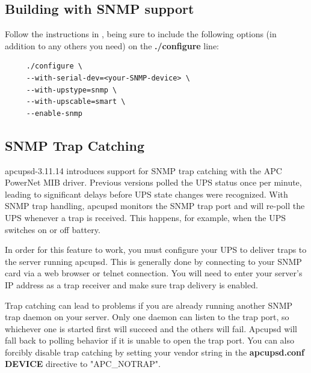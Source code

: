 {{{{{{{\subsection*{Building with SNMP support}

Follow the instructions in 
,
being sure to include the following options (in addition to any others you need) on the
{\bf ./configure} line: 

\footnotesize
\begin{verbatim}
     ./configure \
     --with-serial-dev=<your-SNMP-device> \
     --with-upstype=snmp \
     --with-upscable=smart \
     --enable-snmp
\end{verbatim}
\normalsize

\label{SNMP-Trap-Catching}
\subsection*{SNMP Trap Catching}

apcupsd-3.11.14 introduces support for SNMP trap catching with the APC
PowerNet MIB driver. Previous versions polled the UPS status once per minute, 
leading to significant delays before UPS state changes were recognized. With 
SNMP trap handling, apcupsd monitors the SNMP trap port and will re-poll the
UPS whenever a trap is received. This happens, for example, when the UPS 
switches on or off battery.

In order for this feature to work, you must configure your UPS to
deliver traps to the server running apcupsd. This is generally done by 
connecting to your SNMP card via a web browser or telnet connection. You
will need to enter your server's IP address as a trap receiver and make sure
trap delivery is enabled.

Trap catching can lead to problems if you are already running another SNMP
trap daemon on your server. Only one daemon can listen to the trap port, so
whichever one is started first will succeed and the others will fail. Apcupsd
will fall back to polling behavior if it is unable to open the trap port. You
can also forcibly disable trap catching by setting your vendor string in the
{\bf apcupsd.conf} {\bf DEVICE} directive to "APC\_NOTRAP".

}}}}}}}
